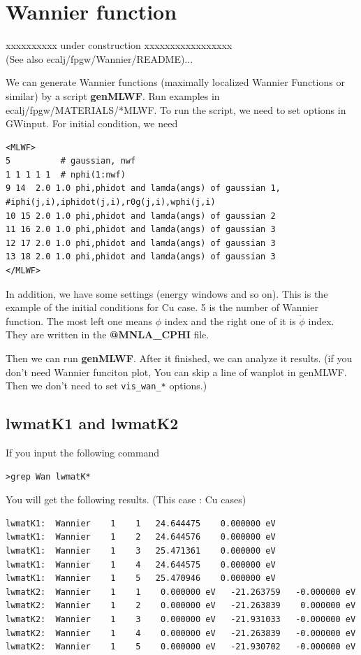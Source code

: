 \documentclass[a4paper,10pt,epsf,fleqn]{article}
\newcommand{\exe}[1]{{\bf #1}}
\newcommand{\io}[1]{{\sf  #1}}
\begin{document}
{\section{Wannier function }
xxxxxxxxxx under construction xxxxxxxxxxxxxxxxx\\
(See also ecalj/fpgw/Wannier/README)...

We can generate Wannier functions 
(maximally localized Wannier Functions or similar) 
by a script \exe{genMLWF}.
Run examples in \io{ecalj/fpgw/MATERIALS/*MLWF}.
To run the script, we need to set options in GWinput.
For initial condition, we need
\begin{verbatim}
<MLWF>
5          # gaussian, nwf
1 1 1 1 1  # nphi(1:nwf)
9 14  2.0 1.0 phi,phidot and lamda(angs) of gaussian 1, #iphi(j,i),iphidot(j,i),r0g(j,i),wphi(j,i)
10 15 2.0 1.0 phi,phidot and lamda(angs) of gaussian 2
11 16 2.0 1.0 phi,phidot and lamda(angs) of gaussian 3
12 17 2.0 1.0 phi,phidot and lamda(angs) of gaussian 3
13 18 2.0 1.0 phi,phidot and lamda(angs) of gaussian 3
</MLWF>
\end{verbatim}
In addition, we have some settings (energy windows and so on).
This is the example of the initial conditions for Cu case. 
5 is the number of Wannier function. The most left one means $\phi$ index and the right one of it is $\dot\phi$ index. They are written in the {\bf @MNLA\_CPHI} file.

Then we can run \exe{genMLWF}. 
After it finished, we can analyze it results.
(if you don't need Wannier funciton plot, 
You can skip a line of wanplot in genMLWF. Then we  don't need to set
\verb+vis_wan_*+ options.)

\subsection{lwmatK1 and lwmatK2}
If you input the following command
\begin{verbatim}
>grep Wan lwmatK*
\end{verbatim}

You will get the following results. (This case : Cu cases)
\begin{verbatim}
lwmatK1:  Wannier    1    1   24.644475    0.000000 eV
lwmatK1:  Wannier    1    2   24.644576    0.000000 eV
lwmatK1:  Wannier    1    3   25.471361    0.000000 eV
lwmatK1:  Wannier    1    4   24.644575    0.000000 eV
lwmatK1:  Wannier    1    5   25.470946    0.000000 eV
lwmatK2:  Wannier    1    1    0.000000 eV   -21.263759   -0.000000 eV
lwmatK2:  Wannier    1    2    0.000000 eV   -21.263839    0.000000 eV
lwmatK2:  Wannier    1    3    0.000000 eV   -21.931033   -0.000000 eV
lwmatK2:  Wannier    1    4    0.000000 eV   -21.263839   -0.000000 eV
lwmatK2:  Wannier    1    5    0.000000 eV   -21.930702   -0.000000 eV
\end{verbatim}


}
\end{document}
